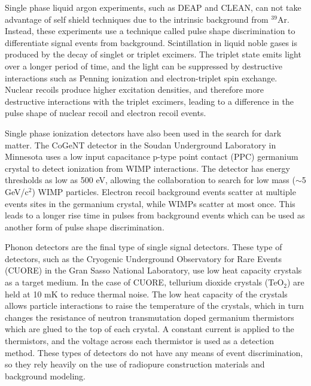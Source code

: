 Single phase liquid argon experiments, such as DEAP and CLEAN, can not take advantage of self shield techniques due to the intrinsic background from $^{39}$Ar.  Instead, these experiments use a technique called pulse shape discrimination to differentiate signal events from background.  Scintillation in liquid noble gases is produced by the decay of singlet or triplet excimers.  The triplet state emits light over a longer period of time, and the light can be suppressed by destructive interactions such as Penning ionization and electron-triplet spin exchange.  Nuclear recoils produce higher excitation densities, and therefore more destructive interactions with the triplet excimers, leading to a difference in the pulse shape of nuclear recoil and electron recoil events. 

Single phase ionization detectors have also been used in the search for dark matter.  The CoGeNT detector in the Soudan Underground Laboratory in Minnesota uses a low input capacitance p-type point contact (PPC) germanium crystal to detect ionization from WIMP interactions.  The detector has energy thresholds as low as 500 eV, allowing the collaboration to search for low mass ($\sim$5 GeV/c$^2$) WIMP particles.  Electron recoil background events scatter at multiple events sites in the germanium crystal, while WIMPs scatter at most once. This leads to a longer rise time in pulses from background events which can be used as another form of pulse shape discrimination.

Phonon detectors are the final type of single signal detectors.  These type of detectors, such as the Cryogenic Underground Observatory for Rare Events (CUORE) in the Gran Sasso National Laboratory, use low heat capacity crystals as a target medium. In the case of CUORE, tellurium dioxide crystals (TeO$_2$) are held at 10 mK to reduce thermal noise.  The low heat capacity of the crystals allows particle interactions to raise the temperature of the crystals, which in turn changes the resistance of neutron transmutation doped germanium thermistors which are glued to the top of each crystal.  A constant current is applied to the thermistors, and the voltage across each thermistor is used as a detection method.  These types of detectors do not have any means of event discrimination, so they rely heavily on the use of radiopure construction materials and background modeling.

